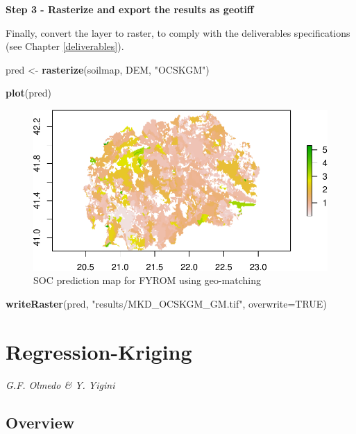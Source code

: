 \documentclass[10pt,b5paper,]{book}
\newenvironment{Shaded}{\begin{snugshade}}{\end{snugshade}}
\newcommand{\DataTypeTok}[1]{\textcolor[rgb]{0.13,0.29,0.53}{#1}}
\newcommand{\KeywordTok}[1]{\textcolor[rgb]{0.13,0.29,0.53}{\textbf{#1}}}
\newcommand{\NormalTok}[1]{#1}
\newcommand{\OtherTok}[1]{\textcolor[rgb]{0.56,0.35,0.01}{#1}}
\newcommand{\StringTok}[1]{\textcolor[rgb]{0.31,0.60,0.02}{#1}}
\theoremstyle{definition}
\theoremstyle{definition}
\theoremstyle{definition}
\theoremstyle{remark}
\begin{document}
\textbf{Step 3 - Rasterize and export the results as geotiff}

Finally, convert the layer to raster, to comply with the deliverables
specifications (see Chapter \ref{deliverables}).

\begin{Shaded}
\begin{Highlighting}[]
\NormalTok{pred <-}\StringTok{ }\KeywordTok{rasterize}\NormalTok{(soilmap, DEM, }\StringTok{"OCSKGM"}\NormalTok{)}

\KeywordTok{plot}\NormalTok{(pred)}
\end{Highlighting}
\end{Shaded}

\begin{figure}
\centering
\includegraphics{SOCMapping_files/figure-latex/unnamed-chunk-32-1.pdf}
\caption{\label{fig:unnamed-chunk-32}SOC prediction map for FYROM using
geo-matching}
\end{figure}

\begin{Shaded}
\begin{Highlighting}[]
\KeywordTok{writeRaster}\NormalTok{(pred, }\StringTok{"results/MKD_OCSKGM_GM.tif"}\NormalTok{,}
            \DataTypeTok{overwrite=}\OtherTok{TRUE}\NormalTok{)}
\end{Highlighting}
\end{Shaded}

\clearpage

\hypertarget{RK}{%
\section{Regression-Kriging}\label{RK}}

\emph{G.F. Olmedo \& Y. Yigini}

\hypertarget{overview-1}{%
\subsection{Overview}\label{overview-1}}
\end{document}
